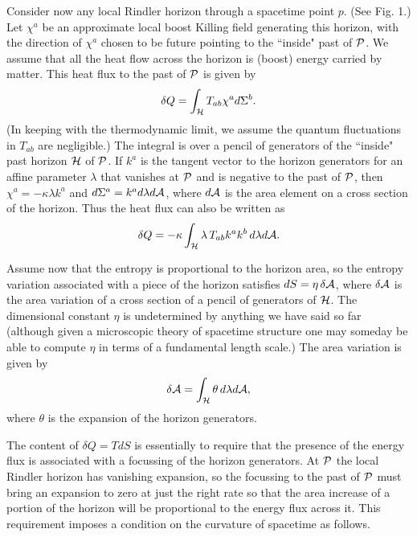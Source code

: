 Consider now any local Rindler horizon through a spacetime point $p$.
(See Fig. 1.)
Let $\chi^a$ be an approximate local boost Killing field
generating this horizon, with the direction of $\chi^a$ chosen to
be future pointing to the ``inside" past of ${\cal P}$. We assume
that all the heat flow across the horizon is (boost) energy
carried by matter. This heat flux to the past of ${\cal P}$ is given by
\begin{equation}
\delta Q=\int_{\cal H} T_{ab}\chi^a d\Sigma^b.
\end{equation}
(In keeping with the thermodynamic limit, we assume
the quantum fluctuations in $T_{ab}$ are negligible.)
The integral is over a pencil of generators of the ``inside"
past horizon ${\cal H}$ of ${\cal P}$.
If $k^a$ is the tangent vector to the horizon generators for
an affine parameter $\lambda$ that vanishes at ${\cal P}$
and is negative to the past of ${\cal P}$, then
$\chi^a=-\kappa\lambda k^a$ and $d\Sigma^a=k^a d\lambda d{\cal A} $,
where $d{\cal A}$ is the area element on a cross section of the
horizon. Thus the heat flux can also be written as
\begin{equation}
\delta Q=-\kappa\int_{\cal H} \lambda \, T_{ab}k^a k^b \,
d\lambda d{\cal A}.
\label{dQ}
\end{equation}

Assume now that the entropy is proportional to the horizon
area, so the entropy variation associated with a piece of the
horizon satisfies $dS=\eta\, \delta{\cal A}$, where $\delta{\cal A}$ is
the area variation of a cross section of a pencil of generators
of ${\cal H}$. The dimensional constant $\eta$ is
undetermined by anything we have said so far
(although given a microscopic theory of spacetime structure
one may someday be able to compute $\eta$ in terms of a
fundamental length scale.)
The area variation is given by
\begin{equation}
\delta{\cal A}=\int_{\cal H} \theta \, d\lambda d{\cal A},
\end{equation}
where $\theta$ is the expansion of the horizon generators.

The content of $\delta Q=T dS$ is essentially to require that
the presence of the energy flux is associated with a focussing
of the horizon generators. At ${\cal P}$ the local Rindler horizon
has vanishing expansion, so the focussing to the past of
${\cal P}$ must bring an expansion to zero at just the right rate so that
the area increase of a portion of the horizon will be
proportional to the energy flux across it.
This requirement imposes a condition on the curvature of
spacetime as follows.

